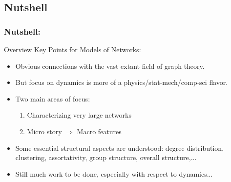 \subsection{Nutshell}


\begin{frame}[label=]
  \frametitle{Nutshell:}

  \begin{block}{Overview Key Points for Models of Networks:}
    \begin{itemize}
    \item<1->
      Obvious connections with the vast
      extant field of graph theory.
    \item<2->
      But focus on dynamics is more of a physics/stat-mech/comp-sci
      flavor.
    \item<3->
      Two main areas of focus:
      \begin{enumerate}
      \item 
         Characterizing very large networks
      \item
         Micro story $\Rightarrow$ Macro features
      \end{enumerate}
    \item<4->
      Some essential structural aspects are understood: degree distribution, clustering,
      assortativity, group structure, overall structure,...
    \item<5->
      Still much work to be done, especially with respect to dynamics...
    \end{itemize}
    
  \end{block}

\end{frame}

